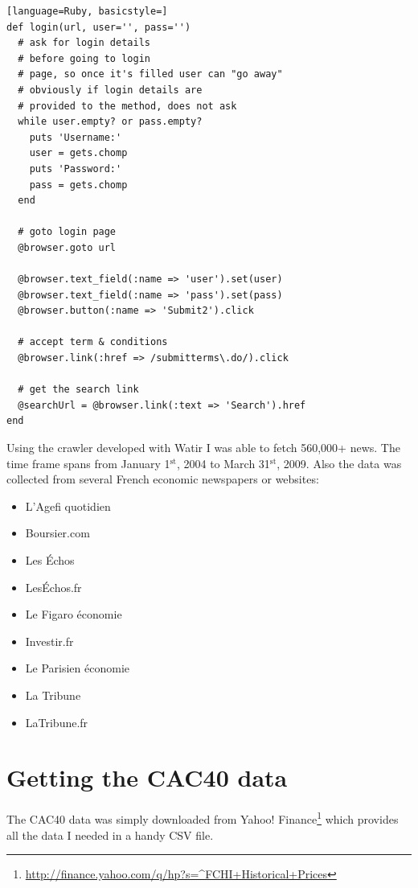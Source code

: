 \documentclass[12pt]{report}
\newcommand{\superscript}[1]{\ensuremath{^{\textrm{#1}}}}
\newcommand{\st}[0]{\superscript{st}}
\begin{document}
			\begin{lstlisting}[language=Ruby, basicstyle=]
def login(url, user='', pass='')
  # ask for login details
  # before going to login
  # page, so once it's filled user can "go away"
  # obviously if login details are 
  # provided to the method, does not ask
  while user.empty? or pass.empty?
    puts 'Username:'
    user = gets.chomp
    puts 'Password:'
    pass = gets.chomp
  end

  # goto login page
  @browser.goto url

  @browser.text_field(:name => 'user').set(user)
  @browser.text_field(:name => 'pass').set(pass)
  @browser.button(:name => 'Submit2').click
                                                                                                 
  # accept term & conditions
  @browser.link(:href => /submitterms\.do/).click

  # get the search link
  @searchUrl = @browser.link(:text => 'Search').href
end
			\end{lstlisting}
			
			Using the crawler developed with Watir I was able to fetch 560,000+ news. The time frame spans from January 1\st, 2004 to March 31\st, 2009. Also the data was collected from several French economic newspapers or websites:
			\begin{itemize}
				\item L'Agefi quotidien
				\item Boursier.com
				\item Les \'Echos
				\item Les\'Echos.fr
				\item Le Figaro économie
				\item Investir.fr
				\item Le Parisien économie
				\item La Tribune
				\item LaTribune.fr
			\end{itemize}
			
		\section{Getting the CAC40 data}
		
			The CAC40 data was simply downloaded from Yahoo! Finance\footnote{\url{http://finance.yahoo.com/q/hp?s=^FCHI+Historical+Prices}} which provides all the data I needed in a handy  CSV file.
		
\end{document}
